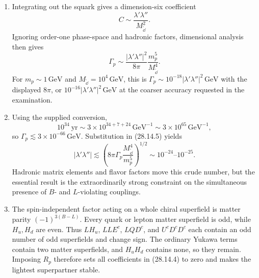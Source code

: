 \begin{enumerate}
\begin{enumerate}
    \item[(d)]
    Integrating out the squark gives a dimension-six coefficient
    \[
      C\sim\frac{\lambda'\lambda''}{M_{\widetilde \dd}^2}.
    \]
    Ignoring order-one phase-space and hadronic factors, dimensional analysis
    then gives
    \[
      \boxed{\Gamma_p\sim
        \frac{|\lambda'\lambda''|^2}{8\pi}
        \frac{m_p^5}{M_{\widetilde \dd}^4}.}
      \tag{28.14.5}
    \]
    For \(m_p\sim1\,\mathrm{GeV}\) and
    \(M_{\widetilde \dd}=10^4\,\mathrm{GeV}\), this is
    \(\Gamma_p\sim10^{-18}|\lambda'\lambda''|^2\,\mathrm{GeV}\) with the
    displayed \(8\pi\), or \(10^{-16}|\lambda'\lambda''|^2\,\mathrm{GeV}\)
    at the coarser accuracy requested in the examination.

    \item[(e)]
    Using the supplied conversion,
    \[
      10^{34}\ \mathrm{yr}
        \sim 3\times10^{34+7+24}\,\mathrm{GeV}^{-1}
        \sim3\times10^{65}\,\mathrm{GeV}^{-1},
    \]
    so \(\Gamma_p\lesssim3\times10^{-66}\,\mathrm{GeV}\).  Substitution in
    (28.14.5) yields
    \[
      |\lambda'\lambda''|
       \lesssim
       \left(8\pi\Gamma_p\frac{M_{\widetilde \dd}^4}{m_p^5}\right)^{1/2}
       \sim10^{-24}\text{--}10^{-25}.
      \tag{28.14.6}
    \]
    Hadronic matrix elements and flavor factors move this crude number, but
    the essential result is the extraordinarily strong constraint on the
    simultaneous presence of \(B\)- and \(L\)-violating couplings.

    \item[(f)]
    The spin-independent factor acting on a whole chiral superfield is matter
    parity \((-1)^{3(B-L)}\).  Every quark or lepton matter superfield is
    odd, while \(H_u,H_d\) are even.  Thus \(L H_u\), \(LLE^c\),
    \(LQD^c\), and \(U^cD^cD^c\) each contain an odd number of odd
    superfields and change sign.  The ordinary Yukawa terms contain two
    matter superfields, and \(H_uH_d\) contains none, so they remain.  Imposing
    \(R_p\) therefore sets all coefficients in (28.14.4) to zero and makes the
    lightest superpartner stable.


\end{enumerate}
\end{enumerate}
